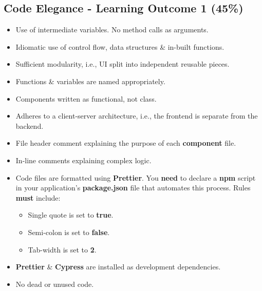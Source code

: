 \documentclass{article}
\begin{document}
\subsection*{Code Elegance - Learning Outcome 1 (45\%)}
\begin{itemize}
    \item Use of intermediate variables. No method calls as arguments.
    \item Idiomatic use of control flow, data structures \& in-built functions.
	\item Sufficient modularity, i.e., UI split into independent reusable pieces.
	\item Functions \& variables are named appropriately.
	\item Components written as functional, not class.
	\item Adheres to a client-server architecture, i.e., the frontend is separate from the backend.
	\item File header comment explaining the purpose of each \textbf{component} file.
	\item In-line comments explaining complex logic.
	\item Code files are formatted using \textbf{Prettier}. You \textbf{need} to declare a \textbf{npm} script in your application's \textbf{package.json} file that automates this process. Rules \textbf{must} include:
	      \begin{itemize}
	      	\item Single quote is set to \textbf{true}.
	      	\item Semi-colon is set to \textbf{false}.
	      	\item Tab-width is set to \textbf{2}.
	      \end{itemize}
	\item \textbf{Prettier} \& \textbf{Cypress} are installed as development dependencies.
	\item No dead or unused code.
\end{itemize}
\end{document}
